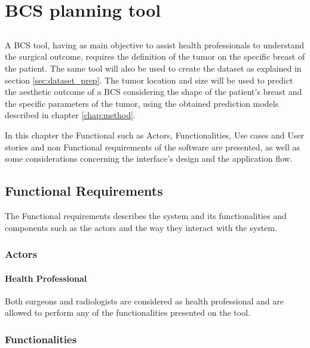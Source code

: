 \chapter{BCS planning tool}\label{chap:tool}

\section*{}

A BCS tool, having as main objective to assist health professionals to understand the surgical outcome, requires the definition of the tumor on the specific breast of the patient. The same tool will also be used to create the dataset as explained in section \ref{sec:dataset_prep}. The tumor location and size will be used to predict the aesthetic outcome of a BCS considering the shape of the patient’s breast and the specific parameters of the tumor, using the obtained prediction models described in chapter \ref{chap:method}.

In this chapter the Functional such as Actors, Functionalities, Use cases and User stories and non Functional requirements of the software are presented, as well as some considerations concerning the interface’s design and the application flow.

\section{Functional Requirements}

The Functional requirements describes the system and its functionalities and components such as the actors and the way they interact with the system.

\subsection{Actors}

\subsubsection{Health Professional}

Both surgeons and radiologists are considered as health professional and are allowed to perform any of the functionalities presented on the tool.

\subsection{Functionalities}

